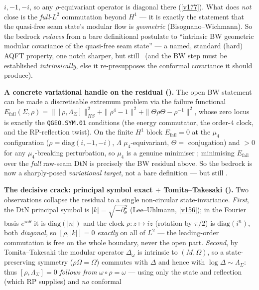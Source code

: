 \documentclass[11pt,a4paper]{article}
\begin{document}
\begin{keybox}
$i,-1,-i$, so any $\rho$-equivariant operator is diagonal there (\vref{v177}). What does \emph{not} close is
the \emph{full}-$L^2$ commutation beyond $H^1$ --- it is exactly the statement that the quasi-free seam
state's modular flow is \emph{geometric} (Bisognano--Wichmann). So the bedrock \emph{reduces} from a bare
definitional postulate to ``intrinsic BW geometric modular covariance of the quasi-free seam state'' --- a
named, standard (hard) AQFT property, one notch sharper, but still \mO\ (and the BW step must be established
\emph{intrinsically}, else it re-presupposes the conformal covariance it should produce).
\par\smallskip\noindent\textbf{A concrete variational handle on the residual ().}
The open BW statement can be made a discretisable extremum problem via the failure functional
$E_{\mathrm{fail}}(\Sigma,\rho)=\|[\rho,\Lambda_\Sigma]\|_{HS}^2+\|\rho^4-1\|^2+\|\Theta\rho\Theta-\rho^{-1}\|^2$,
whose zero locus is exactly the \texttt{QGEO.SYM.01} conditions (the energy commutator, the order-$4$ clock,
and the RP-reflection twist). On the finite $H^1$ block $E_{\mathrm{fail}}=0$ at the $\mu_4$ configuration
($\rho=\mathrm{diag}(i,-1,-i)$, $\Lambda$ $\mu_4$-equivariant, $\Theta=$ conjugation) and $>0$ for any
$\mu_4$-breaking perturbation, so $\mu_4$ is a genuine minimiser \mE; minimising $E_{\mathrm{fail}}$ over
the \emph{full} raw-seam DtN is precisely the BW residual above. So the bedrock is now a sharply-posed
\emph{variational target}, not a bare definition --- but still \mO.
\par\smallskip\noindent\textbf{The decisive crack: principal symbol exact $+$ Tomita--Takesaki
().} Two observations collapse the residual to a single
non-circular state-invariance. \emph{First}, the DtN principal symbol is $|k|=\sqrt{-\partial_\theta^2}$
(Lee--Uhlmann, \vref{v156}); in the Fourier basis $e^{in\theta}$ it is $\mathrm{diag}(|n|)$ and the clock
$\rho:z\mapsto iz$ (rotation by $\pi/2$) is $\mathrm{diag}(i^n)$, both \emph{diagonal}, so
$[\rho,|k|]=0$ \emph{exactly} on all of $L^2$ --- the leading-order commutation is free on the whole
boundary, never the open part. \emph{Second}, by Tomita--Takesaki the modular operator $\Delta_\omega$ is
intrinsic to $(M,\Omega)$, so a state-preserving symmetry ($\rho\Omega=\Omega$) commutes with $\Delta$ and
hence with $\log\Delta\sim\Lambda_\Sigma$: thus $[\rho,\Lambda_\Sigma]=0$ \emph{follows from}
$\omega\circ\rho=\omega$ --- using only the state and reflection (which RP supplies) and \emph{no} conformal

\end{keybox}
\end{document}
